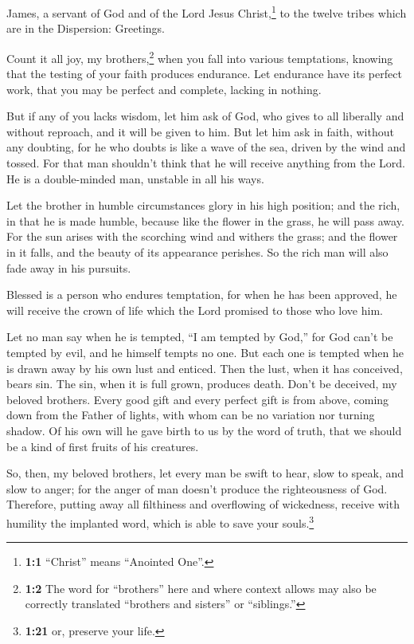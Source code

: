 \begin{paracol}{2}
\begin{otherlanguage}{english}
 James, a servant of God and of the Lord Jesus
Christ,\footnote{\textbf{1:1} ``Christ'' means ``Anointed One''.} to the
twelve tribes which are in the Dispersion: Greetings.

 Count it all joy, my brothers,\footnote{\textbf{1:2} The
  word for ``brothers'' here and where context allows may also be
  correctly translated ``brothers and sisters'' or ``siblings.''} when
you fall into various temptations,  knowing that the
testing of your faith produces endurance.  Let endurance
have its perfect work, that you may be perfect and complete, lacking in
nothing.

 But if any of you lacks wisdom, let him ask of God, who
gives to all liberally and without reproach, and it will be given to
him.  But let him ask in faith, without any doubting, for
he who doubts is like a wave of the sea, driven by the wind and tossed.
 For that man shouldn't think that he will receive
anything from the Lord.  He is a double-minded man,
unstable in all his ways.

 Let the brother in humble circumstances glory in his high
position;  and the rich, in that he is made humble,
because like the flower in the grass, he will pass away. 
For the sun arises with the scorching wind and withers the grass; and
the flower in it falls, and the beauty of its appearance perishes. So
the rich man will also fade away in his pursuits.

 Blessed is a person who endures temptation, for when he
has been approved, he will receive the crown of life which the Lord
promised to those who love him.

 Let no man say when he is tempted, ``I am tempted by
God,'' for God can't be tempted by evil, and he himself tempts no one.
 But each one is tempted when he is drawn away by his own
lust and enticed.  Then the lust, when it has conceived,
bears sin. The sin, when it is full grown, produces death.
 Don't be deceived, my beloved brothers. 
Every good gift and every perfect gift is from above, coming down from
the Father of lights, with whom can be no variation nor turning shadow.
 Of his own will he gave birth to us by the word of
truth, that we should be a kind of first fruits of his creatures.

 So, then, my beloved brothers, let every man be swift to
hear, slow to speak, and slow to anger;  for the anger of
man doesn't produce the righteousness of God.  Therefore,
putting away all filthiness and overflowing of wickedness, receive with
humility the implanted word, which is able to save your
souls.\footnote{\textbf{1:21} or, preserve your life.}


\end{otherlanguage}
\end{paracol}
